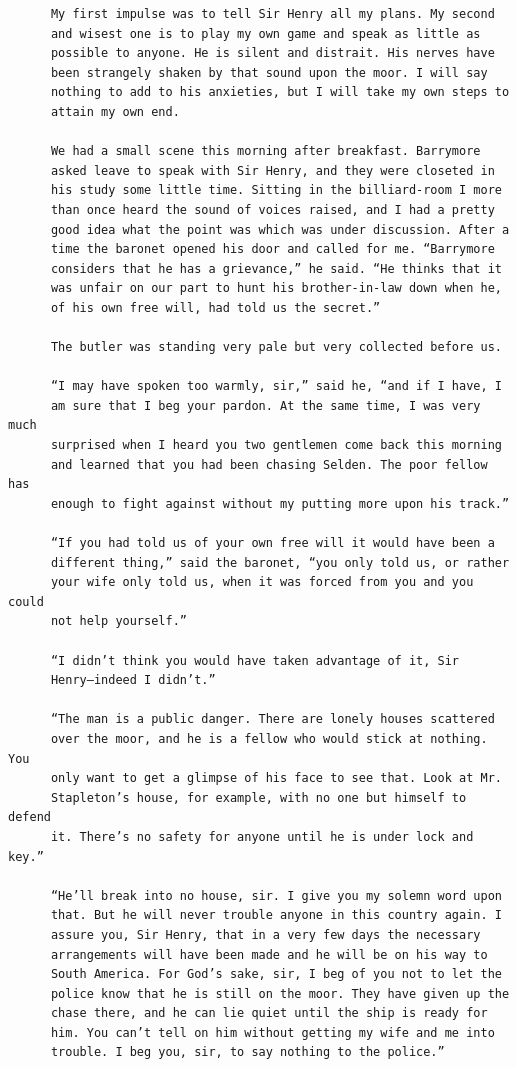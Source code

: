 \documentclass{article}
\begin{document}
\begin{verbatim}
      My first impulse was to tell Sir Henry all my plans. My second
      and wisest one is to play my own game and speak as little as
      possible to anyone. He is silent and distrait. His nerves have
      been strangely shaken by that sound upon the moor. I will say
      nothing to add to his anxieties, but I will take my own steps to
      attain my own end.

      We had a small scene this morning after breakfast. Barrymore
      asked leave to speak with Sir Henry, and they were closeted in
      his study some little time. Sitting in the billiard-room I more
      than once heard the sound of voices raised, and I had a pretty
      good idea what the point was which was under discussion. After a
      time the baronet opened his door and called for me. “Barrymore
      considers that he has a grievance,” he said. “He thinks that it
      was unfair on our part to hunt his brother-in-law down when he,
      of his own free will, had told us the secret.”

      The butler was standing very pale but very collected before us.

      “I may have spoken too warmly, sir,” said he, “and if I have, I
      am sure that I beg your pardon. At the same time, I was very much
      surprised when I heard you two gentlemen come back this morning
      and learned that you had been chasing Selden. The poor fellow has
      enough to fight against without my putting more upon his track.”

      “If you had told us of your own free will it would have been a
      different thing,” said the baronet, “you only told us, or rather
      your wife only told us, when it was forced from you and you could
      not help yourself.”

      “I didn’t think you would have taken advantage of it, Sir
      Henry—indeed I didn’t.”

      “The man is a public danger. There are lonely houses scattered
      over the moor, and he is a fellow who would stick at nothing. You
      only want to get a glimpse of his face to see that. Look at Mr.
      Stapleton’s house, for example, with no one but himself to defend
      it. There’s no safety for anyone until he is under lock and key.”

      “He’ll break into no house, sir. I give you my solemn word upon
      that. But he will never trouble anyone in this country again. I
      assure you, Sir Henry, that in a very few days the necessary
      arrangements will have been made and he will be on his way to
      South America. For God’s sake, sir, I beg of you not to let the
      police know that he is still on the moor. They have given up the
      chase there, and he can lie quiet until the ship is ready for
      him. You can’t tell on him without getting my wife and me into
      trouble. I beg you, sir, to say nothing to the police.”


\end{verbatim}
\end{document}
